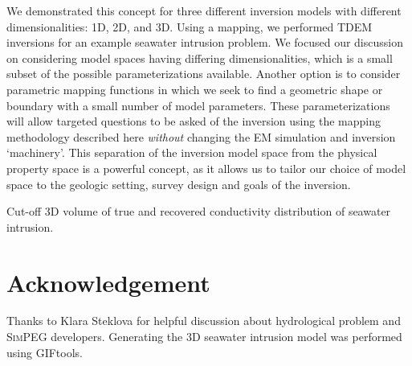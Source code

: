 \documentclass{segabs}
\newcommand{\SimPEG}{\textsc{SimPEG}\xspace}
\begin{document}
We demonstrated this concept for three different inversion models with different dimensionalities: 1D, 2D, and 3D. Using a mapping, we performed TDEM inversions for an example seawater intrusion problem. We focused our discussion on considering model spaces having differing dimensionalities, which is a small subset of the possible parameterizations available. Another option is to consider parametric mapping functions in which we seek to find a geometric shape or boundary with a small number of model parameters. These parameterizations will allow targeted questions to be asked of the inversion using the mapping methodology described here \emph{without} changing the EM simulation and inversion `machinery'. This separation of the inversion model space from the physical property space is a powerful concept, as it allows us to tailor our choice of model space to the geologic setting, survey design and goals of the inversion.


{Cut-off 3D volume of true and recovered conductivity distribution of seawater intrusion.}

\section{Acknowledgement}
Thanks to Klara Steklova for helpful discussion about hydrological problem and  \SimPEG developers. Generating the 3D seawater intrusion model was performed using GIFtools.

\twocolumn
\onecolumn
% 

\end{document}
